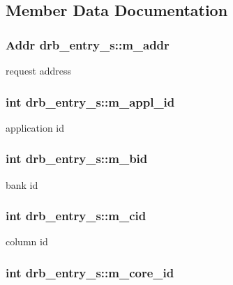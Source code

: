 \subsection{Member Data Documentation}
\hypertarget{structdrb__entry__s_a0f1460584c1177374f945ff1a3a54002}{
\subsubsection[{m\_\-addr}]{\setlength{\rightskip}{0pt plus 5cm}Addr {\bf drb\_\-entry\_\-s::m\_\-addr}}}
\label{structdrb__entry__s_a0f1460584c1177374f945ff1a3a54002}
request address \hypertarget{structdrb__entry__s_addc71155d0dc3d0b0a808fbbab7de012}{
\subsubsection[{m\_\-appl\_\-id}]{\setlength{\rightskip}{0pt plus 5cm}int {\bf drb\_\-entry\_\-s::m\_\-appl\_\-id}}}
\label{structdrb__entry__s_addc71155d0dc3d0b0a808fbbab7de012}
application id \hypertarget{structdrb__entry__s_a432a11793c38396a9dcaa721b4558be5}{
\subsubsection[{m\_\-bid}]{\setlength{\rightskip}{0pt plus 5cm}int {\bf drb\_\-entry\_\-s::m\_\-bid}}}
\label{structdrb__entry__s_a432a11793c38396a9dcaa721b4558be5}
bank id \hypertarget{structdrb__entry__s_a87cb70765e32b180691044cfbbfd2a68}{
\subsubsection[{m\_\-cid}]{\setlength{\rightskip}{0pt plus 5cm}int {\bf drb\_\-entry\_\-s::m\_\-cid}}}
\label{structdrb__entry__s_a87cb70765e32b180691044cfbbfd2a68}
column id \hypertarget{structdrb__entry__s_ab497c914977561ea3f790b90a80fcbea}{
\subsubsection[{m\_\-core\_\-id}]{\setlength{\rightskip}{0pt plus 5cm}int {\bf drb\_\-entry\_\-s::m\_\-core\_\-id}}}
